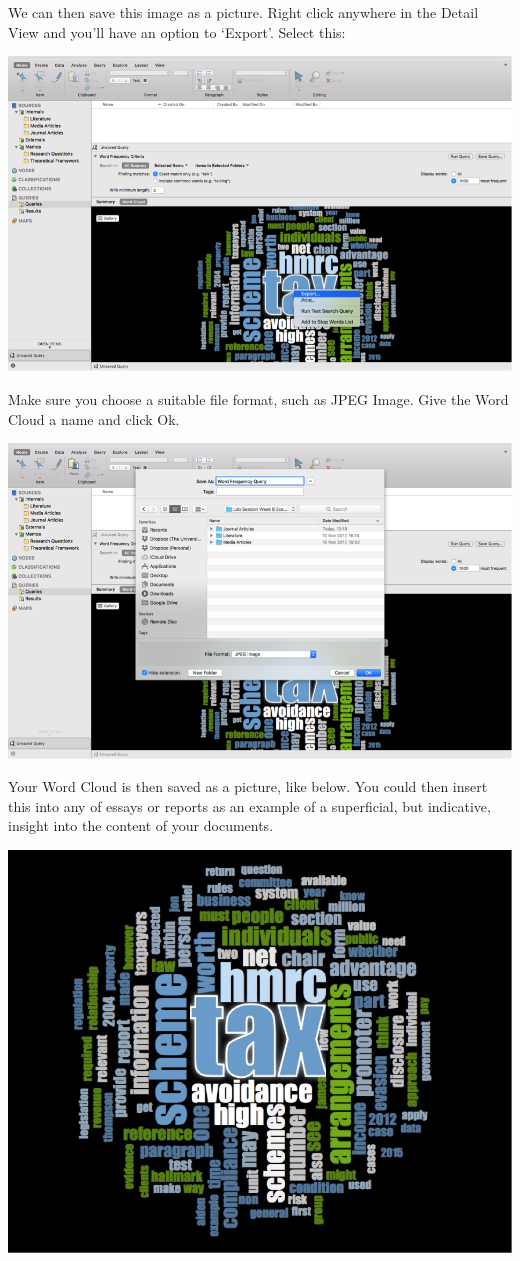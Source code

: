 \documentclass[]{book}
\theoremstyle{definition}
\theoremstyle{definition}
\theoremstyle{definition}
\theoremstyle{remark}
\begin{document}
We can then save this image as a picture. Right click anywhere in the
Detail View and you'll have an option to `Export'. Select this:

\includegraphics{imgs/qual_25.png}

Make sure you choose a suitable file format, such as JPEG Image. Give
the Word Cloud a name and click Ok.

\includegraphics{imgs/qual_26.png}

Your Word Cloud is then saved as a picture, like below. You could then
insert this into any of essays or reports as an example of a
superficial, but indicative, insight into the content of your documents.

\includegraphics{imgs/qual_27.png}
\end{document}
